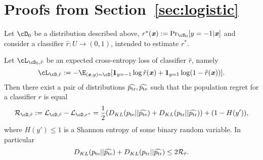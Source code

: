 
\section{Proofs from Section~\ref{sec:logistic}}\label{sec:ProofsLogistic}
\begin{lemma}
\label{lem:population-regret-is-kl}
Let $\cD_0$ be a distribution described above, $r^*(\xx) := \Pr_{\cD_0}[y=-1 | \xx]$ and consider a classifier $\hat{r} : U \to (0, 1)$, intended to estimate $r^*$.

Let $\cL_{\cD_0, \hat{r}}$ be an expected cross-entropy loss of classifier $\hat{r}$, namely
\begin{equation*}
    \cL_{\cD, \hat{r}} := - \E_{(\xx,y) \sim \cD} [ \mathbf{1}_{y=-1} \log \hat{r}(\xx) + \mathbf{1}_{y=1} \log (1-\hat{r}(\xx))].
\end{equation*}
Then there exist a pair of distributions $\widehat{p_{\mathrm{tr}}}, \widehat{p_{\mathrm{te}}}$ such that the population regret for a classifier $\hat{r} $ is equal
\begin{equation*}
    \mathcal{R}_{\cD, \hat{r}} := \mathcal{L}_{\cD, \hat{r}} - \mathcal{L}_{\cD, r^*} = \frac{1}{2} (D_{KL}(\pte || \widehat{\pte}) + D_{KL}(\ptr || \widehat{\ptr})) + (1 - H(y')),
\end{equation*}
where $H(y') \leq 1$ is a Shannon entropy of some binary random variable. In particular
\begin{equation*}
    D_{KL}(p_{\mathrm{te}} || \widehat{p_{\mathrm{te}}}) + D_{KL}(p_{\mathrm{tr}} || \widehat{p_{\mathrm{tr}}}) \leq 2 \mathcal{R}_{\hat{r}}.
\end{equation*}
\end{lemma}


